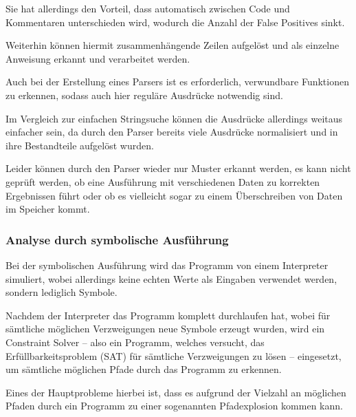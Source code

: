                 Sie hat allerdings den Vorteil,
                dass automatisch zwischen Code und
                Kommentaren unterschieden wird,
                wodurch die Anzahl der False Positives sinkt.

                Weiterhin können hiermit zusammenhängende Zeilen aufgelöst und
                als einzelne Anweisung erkannt und
                verarbeitet werden.

                Auch bei der Erstellung eines Parsers ist es erforderlich,
                verwundbare Funktionen zu erkennen,
                sodass auch hier reguläre Ausdrücke notwendig sind.

                Im Vergleich zur einfachen Stringsuche können die Ausdrücke allerdings weitaus einfacher sein,
                da durch den Parser bereits viele Ausdrücke normalisiert und
                in ihre Bestandteile aufgelöst wurden.

                Leider können durch den Parser wieder nur Muster erkannt werden,
                es kann nicht geprüft werden,
                ob eine Ausführung mit verschiedenen Daten zu korrekten Ergebnissen führt oder
                ob es vielleicht sogar zu einem Überschreiben von Daten im Speicher kommt.

            \subsubsection{Analyse durch symbolische Ausführung}\label{Analyse durch symbolische Ausführung}
                Bei der symbolischen Ausführung wird das Programm von einem Interpreter simuliert,
                wobei allerdings keine echten Werte als Eingaben verwendet werden,
                sondern lediglich Symbole.\cite[5]{Hicks2013}

                Nachdem der Interpreter das Programm komplett durchlaufen hat,
                wobei für sämtliche möglichen Verzweigungen neue Symbole erzeugt wurden,
                wird ein Constraint Solver
                -- also ein Programm,
                welches versucht,
                das Erfüllbarkeitsproblem
                (SAT) für sämtliche Verzweigungen zu lösen
                -- eingesetzt,
                um sämtliche möglichen Pfade durch das Programm zu erkennen.

                Eines der Hauptprobleme hierbei ist,
                dass es aufgrund der Vielzahl an möglichen Pfaden durch ein Programm zu einer sogenannten Pfadexplosion kommen kann.\cite[9]{Hicks2013}

